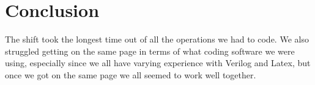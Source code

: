 \documentclass[
	letterpaper, %
	10pt, %
]{CSUniSchoolLabReport}
\begin{document}


\section{Conclusion}
The shift took the longest time out of all the operations we had to code. We also struggled getting on the same page in terms of what coding software we were using, especially since we all have varying experience with Verilog and Latex, but once we got on the same page we all seemed to work well together.


\end{document}
